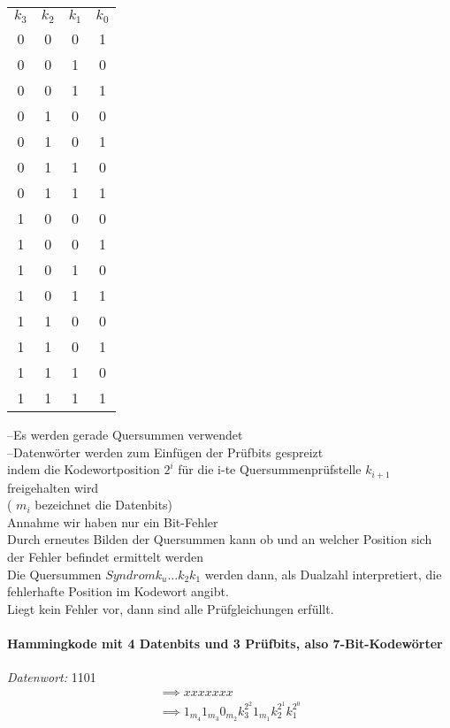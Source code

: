 \documentclass[a4paper]{scrartcl}
\begin{document}
						\begin{table}[H]
							\centering
							\begin{tabular}{c c c c}
								\(k_3\) &\(k_2\) & \(k_1\)& \( k_0 \)\\
								0&0&0&1\\
								0&0&1&0\\
								0&0&1&1\\
								0&1&0&0\\
								0&1&0&1\\
								0&1&1&0\\
								0&1&1&1\\
								1&0&0&0\\
								1&0&0&1\\
								1&0&1&0\\
								1&0&1&1\\
								1&1&0&0\\
								1&1&0&1\\
								1&1&1&0\\
								1&1&1&1\\
							\end{tabular}
						\end{table}
					
					--Es werden gerade Quersummen verwendet\\
					--Datenwörter werden zum Einfügen der Prüfbits gespreizt\\
					indem die Kodewortposition \( 2^i \) für die i-te Quersummenprüfstelle \( k_{i+1} \) freigehalten wird \\
					( \( m_i  \) bezeichnet die Datenbits)\\
					
					Annahme wir haben nur ein Bit-Fehler\\
					Durch erneutes Bilden der Quersummen kann ob und an welcher Position sich der Fehler befindet ermittelt werden \\
					Die Quersummen \( Syndrom k_u \dots k_2 k_1 \) werden dann, als Dualzahl interpretiert, die fehlerhafte Position im Kodewort angibt.\\
					Liegt kein Fehler vor,
					dann sind alle Prüfgleichungen erfüllt.\\
					
					\paragraph{Hammingkode mit 4 Datenbits und 3 Prüfbits, also 7-Bit-Kodewörter}
					\emph{Datenwort:} 1101
					\begin{align*}
						&\implies xxxxxxx&\\
						&\implies 1_{m_4} 1_{m_3} 0_{m_2} k_3^{2^2} 1_{m_1}  k_2^{2^1} k_1^{2^0}&\\
					\end{align*}
					
\end{document}
